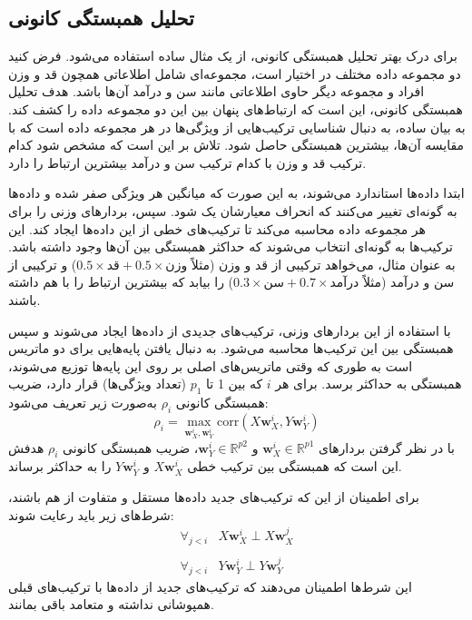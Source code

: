  
 
 
 \subsection{
 	تحلیل همبستگی کانونی%
 }
 برای درک بهتر تحلیل همبستگی کانونی، از یک مثال ساده استفاده می‌شود. فرض کنید دو مجموعه داده مختلف در اختیار است، مجموعه‌ای شامل اطلاعاتی همچون قد و وزن افراد و مجموعه دیگر حاوی اطلاعاتی مانند سن و درآمد آن‌ها باشد. هدف تحلیل همبستگی کانونی، این است که ارتباط‌های پنهان بین این دو مجموعه داده را کشف کند. به بیان ساده،
 به دنبال شناسایی ترکیب‌هایی از ویژگی‌ها در هر مجموعه داده است که با مقایسه آن‌ها، بیشترین همبستگی حاصل شود. تلاش بر این است که مشخص شود کدام ترکیب قد و وزن با کدام ترکیب سن و درآمد بیشترین ارتباط را دارد.
 
 ابتدا داده‌ها استاندارد می‌شوند، به این صورت که میانگین هر ویژگی صفر شده و داده‌ها به گونه‌ای تغییر می‌کنند که انحراف معیارشان یک شود. سپس،
 بردارهای وزنی را برای هر مجموعه داده محاسبه می‌کند تا ترکیب‌های خطی از این داده‌ها ایجاد کند. این ترکیب‌ها به گونه‌ای انتخاب می‌شوند که حداکثر همبستگی بین آن‌ها وجود داشته باشد. به عنوان مثال،
 می‌خواهد ترکیبی از قد و وزن (مثلاً \(0.5 \times \text{قد} + 0.5 \times \text{وزن}\)) و ترکیبی از سن و درآمد (مثلاً \(0.3 \times \text{سن} + 0.7 \times \text{درآمد}\)) را بیابد که بیشترین ارتباط را با هم داشته باشند.
 
 با استفاده از این بردارهای وزنی، ترکیب‌های جدیدی از داده‌ها ایجاد می‌شوند و سپس همبستگی بین این ترکیب‌ها محاسبه می‌شود.
 به دنبال یافتن پایه‌هایی برای دو ماتریس است به طوری که وقتی ماتریس‌های اصلی بر روی این پایه‌ها توزیع می‌شوند، همبستگی به حداکثر برسد. برای هر \(i\) که بین 1 تا \(p_1\) (تعداد ویژگی‌ها) قرار دارد، ضریب همبستگی کانونی \( \rho_i \) به‌صورت زیر تعریف می‌شود: 
 \begin{equation}
 	\rho_i = \max_{\mathbf{w}_X^i, \mathbf{w}_Y^i} \text{corr}(X \mathbf{w}_X^i, Y \mathbf{w}_Y^i)
 \end{equation}
 با در نظر گرفتن بردارهای \(\mathbf{w}_X^i \in \mathbb{R}^{p1}\) و \(\mathbf{w}_Y^i \in \mathbb{R}^{p2}\)، ضریب همبستگی کانونی \( \rho_i \) هدفش این است که همبستگی بین ترکیب خطی \( X \mathbf{w}_X^i \) و \( Y \mathbf{w}_Y^i \) را به حداکثر برساند.
 
 برای اطمینان از این که ترکیب‌های جدید داده‌ها مستقل و متفاوت از هم باشند، شرط‌های زیر باید رعایت شوند:
 \begin{equation}
 	\begin{array}{ll}
 		\forall_{j<i} & X \mathbf{w}_X^i \perp X \mathbf{w}_X^j
 		\\
 		\\
 		\forall_{j<i} & Y \mathbf{w}_Y^i \perp Y \mathbf{w}_Y^j
 	\end{array}
 \end{equation}
 این شرط‌ها اطمینان می‌دهند که ترکیب‌های جدید از داده‌ها با ترکیب‌های قبلی همپوشانی نداشته و متعامد باقی بمانند.
 
